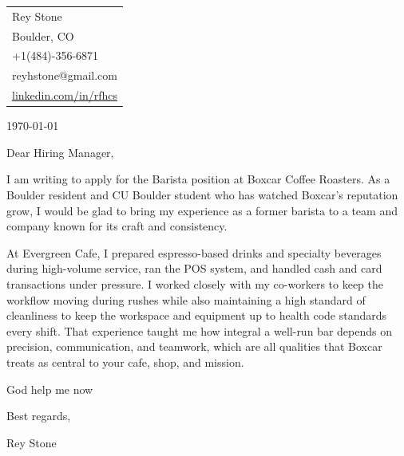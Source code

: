 \documentclass[11pt]{article}
\begin{document}
\hfill
\begin{tabular}{l @{}}
\hfill {Rey Stone} \\
\hfill {Boulder, CO} \\
\hfill {+1(484)-356-6871} \\
\hfill {reyhstone@gmail.com} \\
\hfill {\href{https://linkedin.com/in/reyhstone}{linkedin.com/in/rfhcs}} \\
\end{tabular}

\today

\bigskip %

Dear Hiring Manager,

\bigskip %


I am writing to apply for the Barista position at Boxcar Coffee Roasters. As a Boulder resident and CU Boulder student who has watched Boxcar's reputation grow, I would be glad to bring my experience as a former barista to a team and company known for its craft and consistency.

At Evergreen Cafe, I prepared espresso-based drinks and specialty beverages during high-volume service, ran the POS system, and handled cash and card transactions under pressure. I worked closely with my co-workers to keep the workflow moving during rushes while also maintaining a high standard of cleanliness to keep the workspace and equipment up to health code standards every shift. That experience taught me how integral a well-run bar depends on precision, communication, and teamwork, which are all qualities that Boxcar treats as central to your cafe, shop, and mission.

God help me now

\bigskip

Best regards,

Rey Stone
\end{document}
